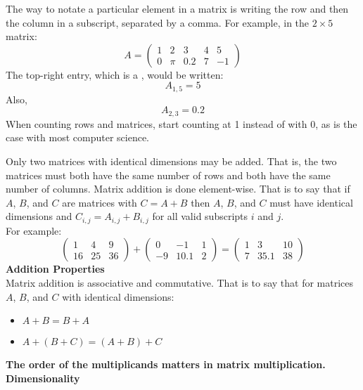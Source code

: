 
The way to notate a particular element in a matrix is writing the row and then the column in a subscript, separated by a comma. For example, in the $2\times 5$ matrix:
\[
A=\begin{pmatrix} 1 & 2 & 3 & 4 & 5 \\ 0 & \pi & 0.2 & 7 & -1 \end{pmatrix} 
\]
The top-right entry, which is a , would be written:
\[
A_{1,5}=5
\]
Also,
\[
A_{2,3}=0.2
\]
When counting rows and matrices, start counting at 1 instead of with 0, as is the case with most computer science. \\


Only two matrices with identical dimensions may be added. That is, the two matrices must both have the same number of rows and both have the same number of columns. Matrix addition is done element-wise. That is to say that if $A$, $B$, and $C$ are matrices with $C=A+B$ then $A$, $B$, and $C$ must have identical dimensions and $C_{i,j}=A_{i,j}+B_{i,j}$ for all valid subscripts $i$ and $j$. \\

For example:
\[
\begin{pmatrix} 1 & 4 & 9 \\ 16 & 25 & 36 \end{pmatrix} + \begin{pmatrix} 0 & -1 & 1 \\ -9 & 10.1 & 2 \end{pmatrix} = \begin{pmatrix} 1 & 3 & 10 \\ 7 & 35.1 & 38 \end{pmatrix}
\]
\textbf{Addition Properties} \\

Matrix addition is associative and commutative. That is to say that for matrices $A$, $B$, and $C$ with identical dimensions:
\begin{itemize}
\item $A+B=B+A$
\item $A+(B+C)=(A+B)+C$
\end{itemize}


\textbf{The order of the multiplicands matters in matrix multiplication.} \\

\textbf{Dimensionality} \\

